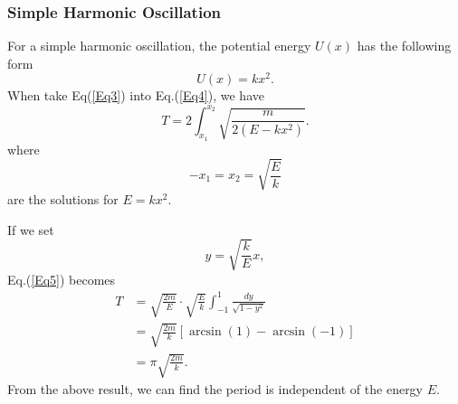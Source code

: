 \documentclass[%
 reprint,
 amsmath,amssymb,
 aps,
]{revtex4-1}
\begin{document}
\subsubsection{Simple Harmonic Oscillation}
For a simple harmonic oscillation, the potential energy $U(x)$ has the following form
\begin{equation}
    U(x)=kx^2.
\label{Eq3}
\end{equation}
When take Eq(\ref{Eq3}) into Eq.(\ref{Eq4}), we have
\begin{equation}
    T=2\int_{x_1}^{x_2}\sqrt{\frac{m}{2(E-kx^2)}}.
\label{Eq5}
\end{equation}
where
\begin{equation}
-x_1=x_2=\sqrt{\frac{E}{k}}
\end{equation}
are the solutions for $E=kx^2$.

If we set
\begin{equation}
    y=\sqrt{\frac{k}{E}}x,
\end{equation}
Eq.(\ref{Eq5}) becomes
\begin{equation}
\begin{aligned}
T&=\sqrt{\frac{2m}{E}}\cdot\sqrt{\frac{E}{k}}\int_{-1}^{1}\frac{dy}{\sqrt{1-y^2}}\\
&=\sqrt{\frac{2m}{k}}[\arcsin{(1)}-\arcsin{(-1)}]\\
&=\pi\sqrt{\frac{2m}{k}}.
\end{aligned}
\end{equation}
From the above result, we can find the period is independent of the energy $E$.
\end{document}
